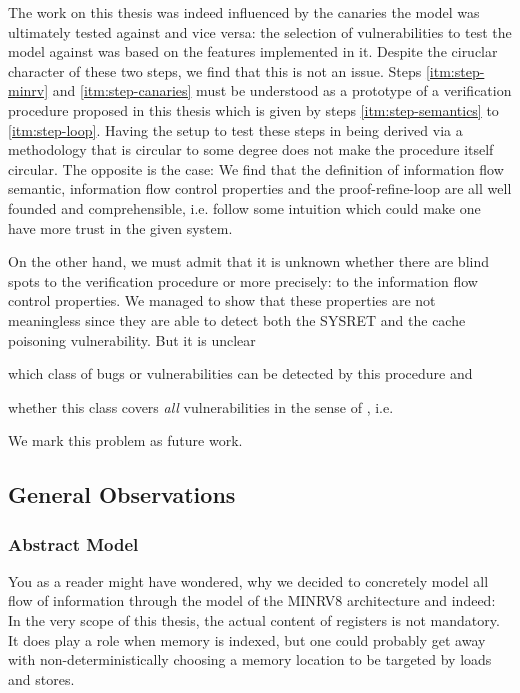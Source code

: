 The work on this thesis was indeed influenced by the canaries the model was ultimately tested against and vice versa: the selection of vulnerabilities to test the model against was based on the features implemented in it.
Despite the ciruclar character of these two steps, we find that this is not an issue.
Steps \ref{itm:step-minrv} and \ref{itm:step-canaries} must be understood as a prototype of a verification procedure proposed in this thesis which is given by steps \ref{itm:step-semantics} to \ref{itm:step-loop}.
Having the setup to test these steps in being derived via a methodology that is circular to some degree does not make the procedure itself circular.
The opposite is the case:
We find that the definition of information flow semantic, information flow control properties and the proof-refine-loop are all well founded and comprehensible, i.e. follow some intuition which could make one have more trust in the given system.

On the other hand, we must admit that it is unknown whether there are blind spots to the verification procedure or more precisely: to the information flow control properties.
We managed to show that these properties are not meaningless since they are able to detect both the SYSRET and the cache poisoning vulnerability.
But it is unclear
\begin{enumerate*}[label=\alph*)]
    \item which class of bugs or vulnerabilities can be detected by this procedure and
    \item whether this class covers \textit{all} vulnerabilities in the sense of \citeauthor{Piano}, i.e. 
\end{enumerate*}
We mark this problem as future work.

\subsection{General Observations}
\label{sec:discuss-observations}

\subsubsection{Abstract Model}

You as a reader might have wondered, why we decided to concretely model all flow of information through the model of the MINRV8 architecture and indeed: In the very scope of this thesis, the actual content of registers is not mandatory.
It does play a role when memory is indexed, but one could probably get away with non-deterministically choosing a memory location to be targeted by loads and stores.


